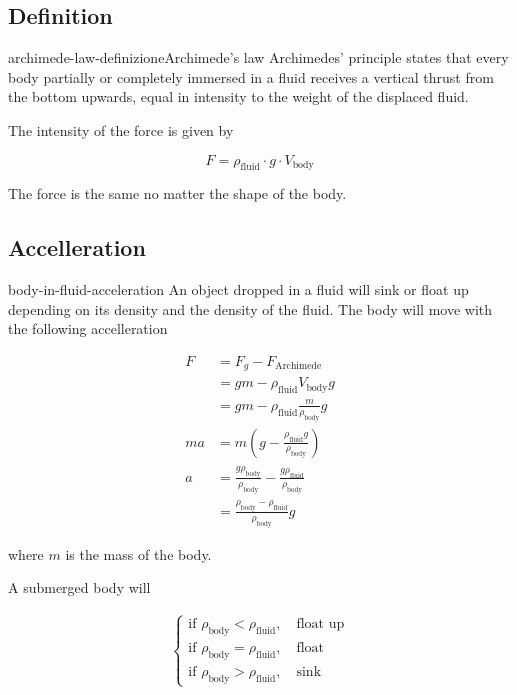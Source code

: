 \documentclass[preview]{standalone}
\begin{document}
\subsection{Definition}

\begin{snippetdefinition}{archimede-law-definizione}{Archimede's law}
    Archimedes' principle states that
    every body partially or completely immersed in a fluid receives a
    vertical thrust from the bottom upwards,
    equal in intensity to the weight of the displaced fluid.

    The intensity of the force is given by

    \[
        F = \rho_\text{fluid} \cdot g \cdot V_\text{body}
    \]

    The force is the same no matter the shape of the body.
\end{snippetdefinition}

\subsection{Accelleration}

\begin{snippet}{body-in-fluid-acceleration}
    An object dropped in a fluid will sink or float up
    depending on its density and the density of the fluid.
    The body will move with the following accelleration

    \begin{align*}
        F &= F_g - F_\text{Archimede} \\
        &= gm - \rho_\text{fluid}V_\text{body}g \\
        &= gm - \rho_\text{fluid}\frac{m}{\rho_\text{body}}g \\
        ma &= m \left( g- \frac{\rho_\text{fluid}g}{\rho_\text{body}} \right) \\
        a &= \frac{g\rho_\text{body}}{\rho_\text{body}} - \frac{g\rho_\text{fluid}}{\rho_\text{body}} \\
        &= \frac{\rho_\text{body} - \rho_\text{fluid}}{\rho_\text{body}}g
    \end{align*}

    where \(m\) is the mass of the body.

    A submerged body will

    \begin{align*}
        \begin{cases}
            \text{if } \rho_\text{body} < \rho_\text{fluid},\quad \text{float up} \\
            \text{if } \rho_\text{body} = \rho_\text{fluid},\quad \text{float} \\
            \text{if } \rho_\text{body} > \rho_\text{fluid},\quad \text{sink}
        \end{cases}
    \end{align*}
    \phantom{}
\end{snippet}
\end{document}
